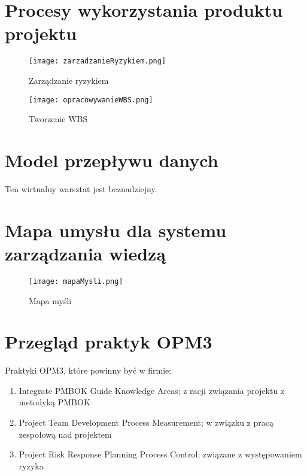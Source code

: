 
\section{Procesy wykorzystania produktu projektu}

\begin{figure}[!h]
\centering
\texttt{[image: zarzadzanieRyzykiem.png]}
\caption{Zarządzanie ryzykiem}
\label{fig:zarzadzanieRyzykiem}
\end{figure}

\begin{figure}[!h]
\centering
\texttt{[image: opracowywanieWBS.png]}
\caption{Tworzenie WBS}
\label{fig:opracowanieWBS}
\end{figure}

\clearpage


\section{Model przepływu danych}

Ten wirtualny warsztat jest beznadziejny.


\section{Mapa umysłu dla systemu zarządzania wiedzą}

\begin{figure}[!h]
\centering
\texttt{[image: mapaMysli.png]}
\caption{Mapa myśli}
\label{fig:mapaMysli}
\end{figure}

\clearpage


\section{Przegląd praktyk OPM3}

Praktyki OPM3, które powinny być w firmie:

\begin{enumerate}
\item Integrate PMBOK Guide Knowledge Areas; z racji związania projektu z metodyką PMBOK
\item Project Team Development Process Measurement; w związku z pracą zespołową nad projektem
\item Project Risk Response Planning Process Control; związane z występowaniem ryzyka
\end{enumerate}

